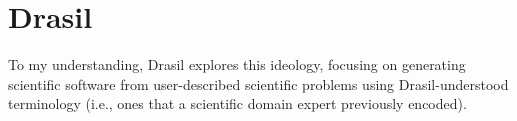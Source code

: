 \section{Drasil}
\label{chap:ideology:sec:drasil}

To my understanding, Drasil \cite{Drasil2021} explores this ideology, focusing
on generating scientific software from user-described scientific problems using
Drasil-understood terminology (i.e., ones that a scientific domain expert
previously encoded).
